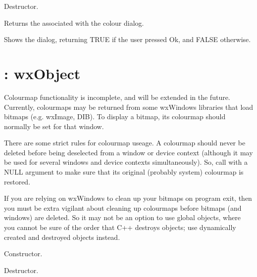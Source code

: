 

Destructor.



Returns the  associated with the colour dialog.



Shows the dialog, returning TRUE if the user pressed Ok, and FALSE
otherwise.

\section{: wxObject}\label{wxcolourmap}

Colourmap functionality is incomplete, and will be extended in the future.
Currently, colourmaps may be returned from some wxWindows libraries
that load bitmaps (e.g. wxImage, DIB). To display a bitmap, its colourmap
should normally be set for that window.

There are some strict rules for colourmap useage. A colourmap should
never be deleted before being deselected from a window or device
context (although it may be used for several windows and device
contexts simultaneously). So, call \rtfsp
with a NULL argument to make sure that its original (probably system)
colourmap is restored.

If you are relying on wxWindows to clean up your bitmaps on program
exit, then you must be extra vigilant about cleaning up colourmaps
before bitmaps (and windows) are deleted. So it may not be an option
to use global objects, where you cannot be sure of the order
that C++ destroys objects; use dynamically created and destroyed
objects instead.



Constructor.



Destructor.

